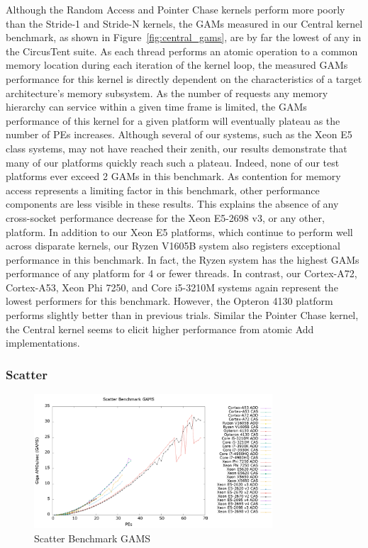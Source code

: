 Although the Random Access and Pointer Chase kernels perform more poorly than the Stride-1 and Stride-N kernels, the GAMs measured in our Central kernel benchmark, as shown in Figure~\ref{fig:central_gams}, are by far the lowest of any in the CircusTent suite.
As each thread performs an atomic operation to a common memory location during each iteration of the kernel loop, the measured GAMs performance for this kernel is directly dependent on the characteristics of a target architecture's memory subsystem.
As the number of requests any memory hierarchy can service within a given time frame is limited, the GAMs performance of this kernel for a given platform will eventually plateau as the number of PEs increases.
Although several of our systems, such as the Xeon E5 class systems, may not have reached their zenith, our results demonstrate that many of our platforms quickly reach such a plateau.
Indeed, none of our test platforms ever exceed 2 GAMs in this benchmark.
As contention for memory access represents a limiting factor in this benchmark, other performance components are less visible in these results.
This explains the absence of any cross-socket performance decrease for the Xeon E5-2698 v3, or any other, platform.
In addition to our Xeon E5 platforms, which continue to perform well across disparate kernels, our Ryzen V1605B system also registers exceptional performance in this benchmark.
In fact, the Ryzen system has the highest GAMs performance of any platform for 4 or fewer threads.
In contrast, our Cortex-A72, Cortex-A53, Xeon Phi 7250, and Core i5-3210M systems again represent the lowest performers for this benchmark.
However, the Opteron 4130 platform performs slightly better than in previous trials.
Similar the Pointer Chase kernel, the Central kernel seems to elicit higher performance from atomic Add implementations.

\subsubsection{Scatter}
\label{subsubsec:scatter_res}

\begin{figure}[!t]
\centering
\includegraphics[width=3.5in]{figures/SCATTER_GAMS.png}
\caption{Scatter Benchmark GAMS}
\label{fig:scatter_gams}
\end{figure}

